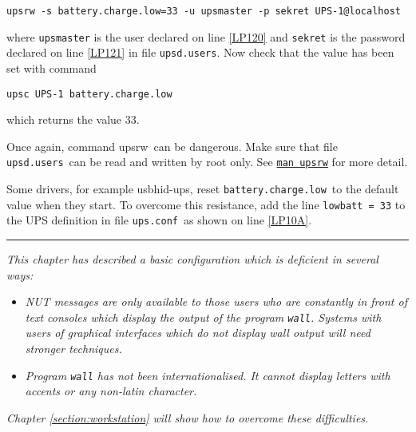\documentclass[12pt]{article}
\newcommand{\newcolumn}{\vfill\eject}
\newcommand{\usbhidups}{\mbox{\textcolor{UPSDCOLOUR}{usbhid-ups}}}
\newcommand{\upsrw}{\mbox{\textcolor{UPSMONCOLOUR}{upsrw}}}
\newcommand{\upsconf}{\textcolor{UPSDCOLOUR}{\texttt{ups.conf}}}
\newcommand{\upsdusers}{\textcolor{UPSDCOLOUR}{\texttt{upsd.users}}}
\newcommand{\batterychargelow}{\textcolor{UPSDCOLOUR}{\texttt{battery{\allowbreak}.charge{\allowbreak}.low}}}
\newcommand{\NUTman}[1]{\href{http://networkupstools.org/docs/man/#1.html}{\texttt{man #1}}}
\newcommand{\ul}{\begin{itemize}%
   \setlength{\itemsep}{0em}}
\newcommand{\eul}{\end{itemize}}
\newcommand{\li}{\item}                 %
\begin{document}
\verb`upsrw -s battery.charge.low=33 -u upsmaster -p sekret UPS-1@localhost`

\noindent where \texttt{upsmaster} is the user declared on line \ref{LP120}
and \texttt{sekret} is the password declared on line \ref{LP121} in file
\upsdusers.  Now check that the value has been set with command

\verb`upsc UPS-1 battery.charge.low`

\noindent which returns the value 33.

Once again, command \upsrw\ can be dangerous.  Make sure that file
\upsdusers\ can be read and written by root only.  See \NUTman{upsrw} for more
detail.

Some drivers, for example \usbhidups, reset \batterychargelow\ to the default
value when they start.  To overcome this resistance, add the line
\texttt{lowbatt = 33} to the UPS definition in file \upsconf\ as shown on line
\ref{LP10A}.

\vspace*{\fill}
\begin{center}\rule{\LinePrinterwidth}{0.5mm}\end{center}
\vspace*{\fill}

\textsl{This chapter has described a basic configuration which is deficient in
  several ways:}

\ul

\li \textsl{NUT messages are only available to those users who are constantly
  in front of text consoles which display the output of the program
  \texttt{wall}.  Systems with users of graphical interfaces which do not
  display wall output will need stronger techniques.}

\li \textsl{Program \texttt{wall} has not been internationalised.  It cannot
  display letters with accents or any non-latin character.}

\eul
 
\textsl{Chapter \ref{section:workstation} will show how to overcome these
  difficulties.}

\vspace*{\fill}

\begin{center}
\end{center}

\vspace*{\fill}


\newcolumn
\end{document}
